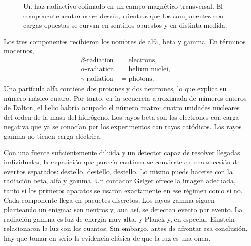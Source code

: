 \begin{figure}[h]
\centering
{}
\caption{Un haz radiactivo colimado en un campo magnético transversal. El componente neutro no se desvía, mientras que los componentes con cargas opuestas se curvan en sentidos opuestos y en distinta medida.}
\end{figure}

Los tres componentes recibieron los nombres de alfa, beta y gamma. En términos modernos,
\begin{equation}
\begin{aligned}
\beta\text{-radiation} &= \text{electrons},\\
\alpha\text{-radiation} &= \text{helium nuclei},\\
\gamma\text{-radiation} &= \text{photons}.
\end{aligned}
\end{equation}
Una partícula alfa contiene dos protones y dos neutrones, lo que explica su número másico cuatro. Por tanto, en la secuencia aproximada de números enteros de Dalton, el helio habría ocupado el número cuatro: cuatro unidades nucleares del orden de la masa del hidrógeno. Los rayos beta son los electrones con carga negativa que ya se conocían por los experimentos con rayos catódicos. Los rayos gamma no tienen carga eléctrica.

Con una fuente suficientemente diluida y un detector capaz de resolver llegadas individuales, la exposición que parecía continua se convierte en una sucesión de eventos separados: destello, destello, destello. Lo mismo puede hacerse con la radiación beta, alfa y gamma. Un contador Geiger ofrece la imagen adecuada, tanto si los primeros aparatos se usaron exactamente en ese régimen como si no. Cada componente llega en paquetes discretos. Los rayos gamma siguen planteando un enigma: son neutros y, aun así, se detectan evento por evento. La radiación gamma es luz de energía muy alta, y Planck y, en especial, Einstein relacionaron la luz con los cuantos. Sin embargo, antes de afrontar esa conclusión, hay que tomar en serio la evidencia clásica de que la luz es una onda.

